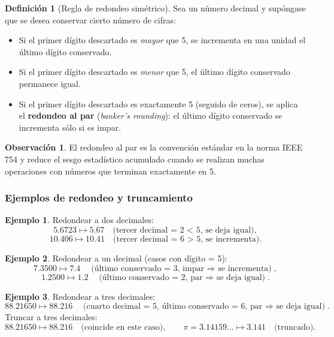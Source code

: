 \documentclass[a4paper,12pt]{article}
\theoremstyle{definition}
\newtheorem{definicion}{Definición}[section]
\newtheorem{ejemplo}{Ejemplo}[section]
\newtheorem{observacion}{Observación}[section]
\theoremstyle{plain}
\begin{document}
\begin{definicion}[Regla de redondeo simétrico]
Sea un número decimal y supóngase que se desea conservar cierto número de
cifras:
\begin{itemize}[leftmargin=1.5em]
    \item Si el primer dígito descartado es \emph{mayor} que 5, se incrementa
          en una unidad el último dígito conservado.
    \item Si el primer dígito descartado es \emph{menor} que 5, el último
          dígito conservado permanece igual.
    \item Si el primer dígito descartado es exactamente 5 (seguido de ceros),
          se aplica el \textbf{redondeo al par} (\emph{banker's rounding}): el
          último dígito conservado se incrementa sólo si es impar.
\end{itemize}
\end{definicion}

\begin{observacion}
El redondeo al par es la convención estándar en la norma IEEE 754 y reduce el
sesgo estadístico acumulado cuando se realizan muchas operaciones con números
que terminan exactamente en 5.
\end{observacion}

\subsubsection{Ejemplos de redondeo y truncamiento}

\begin{ejemplo}
Redondear a dos decimales:
\[
    5.6723 \mapsto 5.67
    \quad \text{(tercer decimal = 2 < 5, se deja igual)},
\]
\[
    10.406 \mapsto 10.41
    \quad \text{(tercer decimal = 6 > 5, se incrementa)}.
\]
\end{ejemplo}

\begin{ejemplo}
Redondear a un decimal (casos con dígito = 5):
\[
    7.3500 \mapsto 7.4
    \quad \text{(último conservado = 3, impar $\Rightarrow$ se incrementa)},
\]
\[
    1.2500 \mapsto 1.2
    \quad \text{(último conservado = 2, par $\Rightarrow$ se deja igual)}.
\]
\end{ejemplo}

\begin{ejemplo}
Redondear a tres decimales:
\[
    88.21650 \mapsto 88.216
    \quad \text{(cuarto decimal = 5, último conservado = 6, par
                $\Rightarrow$ se deja igual)}.
\]
Truncar a tres decimales:
\[
    88.21650 \mapsto 88.216 \quad \text{(coincide en este caso)},
    \qquad
    \pi = 3.14159\ldots \mapsto 3.141 \quad \text{(truncado)}.
\]
\end{ejemplo}
\end{document}
